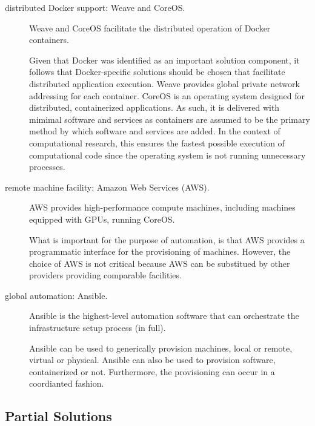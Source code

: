 \begin{description}
\item[distributed \textsf{Docker} support: \textsf{Weave} and \textsf{CoreOS}.]
%
\textsf{Weave} and \textsf{CoreOS} facilitate the distributed operation of \textsf{Docker} containers.

Given that \textsf{Docker} was identified as an important solution component, it follows that \textsf{Docker}-specific solutions should be chosen that facilitate distributed application execution.
%
\textsf{Weave} provides global private network addressing for each container.
%
\textsf{CoreOS} is an operating system designed for distributed, containerized applications.
%
As such, it is delivered with mimimal software and services as containers are assumed to be the primary method by which software and services are added.
%
In the context of computational research, this ensures the fastest possible execution of computational code since the operating system is not running unnecessary processes.

\item[remote machine facility: \textsf{Amazon Web Services (AWS)}.] 
  \textsf{AWS} provides high-performance compute machines, including machines equipped with GPUs, running \textsf{CoreOS}.
  

  What is important for the purpose of automation, is that \textsf{AWS} provides a programmatic interface for the provisioning of machines.
  However, the choice of \textsf{AWS} is not critical because \textsf{AWS} can be substitued by other providers providing comparable facilities.
 


\item[global automation: \textsf{Ansible}.]
  \textsf{Ansible} is the highest-level automation software that can orchestrate the infrastructure setup process (in full).
  
  \textsf{Ansible} can be used to generically provision machines, local or remote, virtual or physical.
  \textsf{Ansible} can also be used to provision software, containerized or not.
  Furthermore, the provisioning can occur in a coordianted fashion.


\end{description}



\subsection{Partial Solutions}


